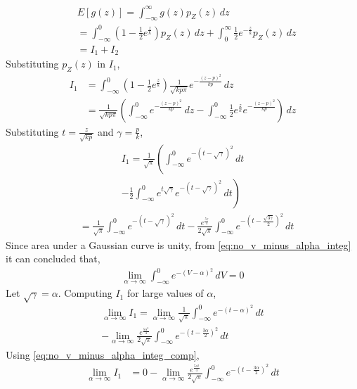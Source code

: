 \documentclass[journal,8pt,onecolumn]{IEEEtran}
\providecommand{\sbrak}[1]{\ensuremath{{}\left[#1\right]}}
\providecommand{\brak}[1]{\ensuremath{\left(#1\right)}}
\begin{document}
\begin{enumerate}
\begin{enumerate}[label=(\alph{enumii})]
\begin{align}
	&E\sbrak{g\brak{z}} = \int_{-\infty}^{\infty} g\brak{z}p_{Z}\brak{z} \,dz\\
	\label{eq:noncoh_bfsk_exp_z_int}
	&=  \int_{-\infty}^{0} \brak{1-\frac{1}{2}e^{\frac{z}{k}}} p_Z\brak{z} \,dz +  \int_{0}^{\infty} \frac{1}{2}e^{-\frac{z}{k}}p_Z\brak{z} \,dz\\
	&= I_1 + I_2
\end{align}
Substituting $p_Z\brak{z}$ in $I_1$,
\begin{align}
	I_1 &= \int_{-\infty}^{0} \brak{1-\frac{1}{2}e^{\frac{z}{k}}} \frac{1}{\sqrt{kp\pi}}e^{-\frac{\brak{z-p}^2}{kp}} \,dz\\
	&= \frac{1}{\sqrt{kp\pi}}\brak{\int_{-\infty}^{0} e^{-\frac{\brak{z-p}^2}{kp}} \,dz - \int_{-\infty}^{0} \frac{1}{2}e^{\frac{z}{k}} e^{-\frac{\brak{z-p}^2}{kp}}} \,dz
\end{align}
Substituting $t = \frac{z}{\sqrt{kp}}$ and $\gamma = \frac{p}{k}$,
\begin{multline}
	I_1 = \frac{1}{\sqrt{\pi}}\left(\int_{-\infty}^{0} e^{-\brak{t-\sqrt{\gamma}}^2} \,dt \right.\\
	\left. - \frac{1}{2} \int_{-\infty}^{0} e^{t \sqrt{\gamma}} e^{-\brak{t-\sqrt{\gamma}}^2} \,dt \right)
\end{multline}
\begin{align}
	&= \frac{1}{\sqrt{\pi}}\int_{-\infty}^{0} e^{-\brak{t-\sqrt{\gamma}}^2} \,dt - \frac{e^{\frac{5\gamma}{4}}}{2\sqrt{\pi}} \int_{-\infty}^{0} e^{-\brak{t-\frac{\sqrt{3\gamma}}{2}}^2} \,dt
\end{align}
Since area under a Gaussian curve is unity, from \eqref{eq:no_v_minus_alpha_integ} it can concluded that,
\begin{align}
	\label{eq:no_v_minus_alpha_integ_comp}
	\lim_{\alpha \rightarrow \infty} \int_{-\infty}^{0} e^{-\brak{V-\alpha}^2} \,dV = 0
\end{align}
Let $\sqrt{\gamma} = \alpha$. Computing $I_1$ for large values of $\alpha$,
\begin{multline}
	\lim_{\alpha \rightarrow \infty} I_1 = \lim_{\alpha \rightarrow \infty} \frac{1}{\sqrt{\pi}} \int_{-\infty}^{0} e^{-\brak{t-\alpha}^2} \,dt\\
	- \lim_{\alpha \rightarrow \infty} \frac{e^{\frac{5\alpha^2}{4}}}{2\sqrt{\pi}} \int_{-\infty}^{0} e^{-\brak{t-\frac{3\alpha}{2}}^2} \,dt
\end{multline}
Using \eqref{eq:no_v_minus_alpha_integ_comp},
\begin{align}
	\lim_{\alpha \rightarrow \infty} I_1 &= 0 - \lim_{\alpha \rightarrow \infty} \frac{e^{\frac{5\alpha^2}{4}}}{2\sqrt{\pi}} \int_{-\infty}^{0} e^{-\brak{t-\frac{3\alpha}{2}}^2} \,dt\\

\end{align}
\end{enumerate}
\end{enumerate}
\end{document}
